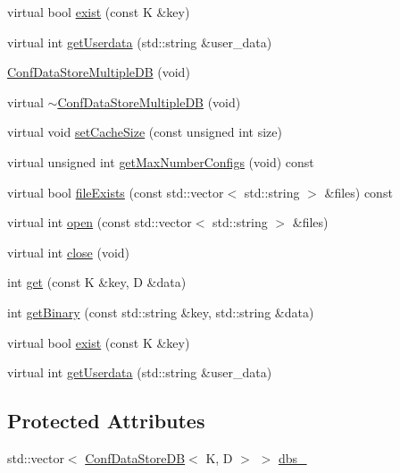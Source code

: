 \begin{DoxyCompactItemize}
\item 
virtual bool \mbox{\hyperlink{classFILEDB_1_1ConfDataStoreMultipleDB_ad80312a9a4767f3b0b567932542d3ee7}{exist}} (const K \&key)
\item 
virtual int \mbox{\hyperlink{classFILEDB_1_1ConfDataStoreMultipleDB_aa3f101137804c73d44e2d87538acc014}{get\+Userdata}} (std\+::string \&user\+\_\+data)
\item 
\mbox{\hyperlink{classFILEDB_1_1ConfDataStoreMultipleDB_a90ff1c27ea7415ba0d874df53fd0b955}{Conf\+Data\+Store\+Multiple\+DB}} (void)
\item 
virtual \mbox{\hyperlink{classFILEDB_1_1ConfDataStoreMultipleDB_a8025977163f25ad73764a794d0c89271}{$\sim$\+Conf\+Data\+Store\+Multiple\+DB}} (void)
\item 
virtual void \mbox{\hyperlink{classFILEDB_1_1ConfDataStoreMultipleDB_a37115269cf1f8f04c49ab888b040fa13}{set\+Cache\+Size}} (const unsigned int size)
\item 
virtual unsigned int \mbox{\hyperlink{classFILEDB_1_1ConfDataStoreMultipleDB_adb7a350dc85ad9c3830e98a0f03b68d7}{get\+Max\+Number\+Configs}} (void) const
\item 
virtual bool \mbox{\hyperlink{classFILEDB_1_1ConfDataStoreMultipleDB_a85c71818db3a3b0a5a67b4dabaed2ff7}{file\+Exists}} (const std\+::vector$<$ std\+::string $>$ \&files) const
\item 
virtual int \mbox{\hyperlink{classFILEDB_1_1ConfDataStoreMultipleDB_a3370c2f938d91e2352815aa45637b46d}{open}} (const std\+::vector$<$ std\+::string $>$ \&files)
\item 
virtual int \mbox{\hyperlink{classFILEDB_1_1ConfDataStoreMultipleDB_a6ab94d980290baa33292b7ec54bfe637}{close}} (void)
\item 
int \mbox{\hyperlink{classFILEDB_1_1ConfDataStoreMultipleDB_a15c985c05120d6076e890f0507ceade7}{get}} (const K \&key, D \&data)
\item 
int \mbox{\hyperlink{classFILEDB_1_1ConfDataStoreMultipleDB_a56fefab208c1b4abc3139afb38035a13}{get\+Binary}} (const std\+::string \&key, std\+::string \&data)
\item 
virtual bool \mbox{\hyperlink{classFILEDB_1_1ConfDataStoreMultipleDB_ad80312a9a4767f3b0b567932542d3ee7}{exist}} (const K \&key)
\item 
virtual int \mbox{\hyperlink{classFILEDB_1_1ConfDataStoreMultipleDB_aa3f101137804c73d44e2d87538acc014}{get\+Userdata}} (std\+::string \&user\+\_\+data)
\end{DoxyCompactItemize}
\subsection*{Protected Attributes}
\begin{DoxyCompactItemize}
\item 
std\+::vector$<$ \mbox{\hyperlink{classFILEDB_1_1ConfDataStoreDB}{Conf\+Data\+Store\+DB}}$<$ K, D $>$ $>$ \mbox{\hyperlink{classFILEDB_1_1ConfDataStoreMultipleDB_a9f562b5117bbeced1cbcae8498d6a884}{dbs\+\_\+}}
\end{DoxyCompactItemize}



